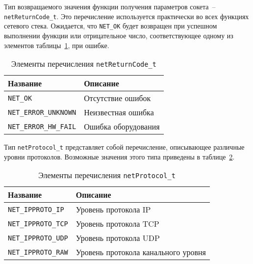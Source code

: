 Тип возвращаемого значения функции получения параметров сокета~-- \lstinline{netReturnCode_t}.
Это перечисление используется практически во всех функциях сетевого стека.
Ожидается, что \lstinline{NET_OK} будет возвращен при успешном выполнении функции
или отрицательное число, соответствующее одному из элементов таблицы~\ref{table:func:netRetCode}, при ошибке.

\begin{table}[ht]
    \caption{Элементы перечисления \lstinline{netReturnCode_t}}
    \label{table:func:netRetCode}
    \begin{tabular}{| >{\raggedright}m{}
                    | >{\raggedright\arraybackslash}m{}|}
        \hline
        \centering Название & \centering\arraybackslash Описание \\

        \hline
        \lstinline[]$NET_OK$ &
        Отсутствие ошибок
        \\

        \hline
        \lstinline[]$NET_ERROR_UNKNOWN$ &
        Неизвестная ошибка
        \\

        \hline
        \lstinline[]$NET_ERROR_HW_FAIL$ &
        Ошибка оборудования
        \\

        \hline
    \end{tabular}
\end{table}

Тип \lstinline{netProtocol_t} представляет собой перечисление, описывающее различные уровни протоколов.
Возможные значения этого типа приведены в таблице~\ref{table:func:netProtocol}.

\begin{table}[ht]
    \caption{Элементы перечисления \lstinline{netProtocol_t}}
    \label{table:func:netProtocol}
    \begin{tabular}{| >{\raggedright}m{}
                    | >{\raggedright\arraybackslash}m{}|}
        \hline
        \centering Название & \centering\arraybackslash Описание \\

        \hline
        \lstinline[]$NET_IPPROTO_IP$ &
        Уровень протокола IP
        \\

        \hline
        \lstinline[]$NET_IPPROTO_TCP$ &
        Уровень протокола TCP
        \\

        \hline
        \lstinline[]$NET_IPPROTO_UDP$ &
        Уровень протокола UDP
        \\

        \hline
        \lstinline[]$NET_IPPROTO_RAW$ &
        Уровень протокола канального уровня
        \\

        \hline
    \end{tabular}
\end{table}

